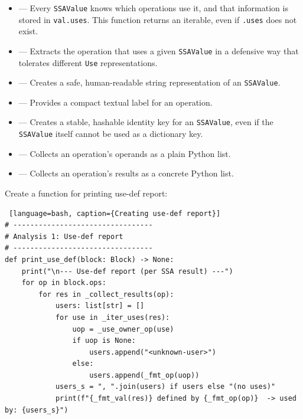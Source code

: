 \documentclass[../main.tex]{subfiles}
\begin{document}
\begin{itemize}
    \item {} — Every \texttt{SSAValue} knows which operations use it,
    and that information is stored in \texttt{val.uses}. This function returns an
    iterable, even if \texttt{.uses} does not exist.

    \item {} — Extracts the operation that uses a given
    \texttt{SSAValue} in a defensive way that tolerates different \texttt{Use}
    representations.

    \item {} — Creates a safe, human-readable string representation
    of an \texttt{SSAValue}.

    \item {} — Provides a compact textual label for an operation.

    \item {} — Creates a stable, hashable identity key for an
    \texttt{SSAValue}, even if the \texttt{SSAValue} itself cannot be used as a
    dictionary key.

    \item {} — Collects an operation's operands as a plain
    Python list.

    \item {} — Collects an operation's results as a concrete
    Python list.
\end{itemize}



Create a function for printing use-def report:
\begin{lstlisting} [language=bash, caption={Creating use-def report}]
# ---------------------------------
# Analysis 1: Use-def report
# ---------------------------------
def print_use_def(block: Block) -> None:
    print("\n--- Use-def report (per SSA result) ---")
    for op in block.ops:
        for res in _collect_results(op):
            users: list[str] = []
            for use in _iter_uses(res):
                uop = _use_owner_op(use)
                if uop is None:
                    users.append("<unknown-user>")
                else:
                    users.append(_fmt_op(uop))
            users_s = ", ".join(users) if users else "(no uses)"
            print(f"{_fmt_val(res)} defined by {_fmt_op(op)}  -> used by: {users_s}")
\end{lstlisting}
\end{document}
